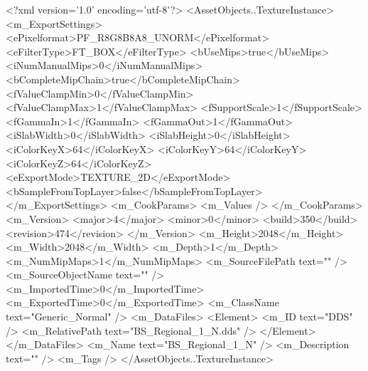 <?xml version='1.0' encoding='utf-8'?>
<AssetObjects..TextureInstance>
  <m_ExportSettings>
    <ePixelformat>PF_R8G8B8A8_UNORM</ePixelformat>
    <eFilterType>FT_BOX</eFilterType>
    <bUseMips>true</bUseMips>
    <iNumManualMips>0</iNumManualMips>
    <bCompleteMipChain>true</bCompleteMipChain>
    <fValueClampMin>0</fValueClampMin>
    <fValueClampMax>1</fValueClampMax>
    <fSupportScale>1</fSupportScale>
    <fGammaIn>1</fGammaIn>
    <fGammaOut>1</fGammaOut>
    <iSlabWidth>0</iSlabWidth>
    <iSlabHeight>0</iSlabHeight>
    <iColorKeyX>64</iColorKeyX>
    <iColorKeyY>64</iColorKeyY>
    <iColorKeyZ>64</iColorKeyZ>
    <eExportMode>TEXTURE_2D</eExportMode>
    <bSampleFromTopLayer>false</bSampleFromTopLayer>
  </m_ExportSettings>
  <m_CookParams>
    <m_Values />
  </m_CookParams>
  <m_Version>
    <major>4</major>
    <minor>0</minor>
    <build>350</build>
    <revision>474</revision>
  </m_Version>
  <m_Height>2048</m_Height>
  <m_Width>2048</m_Width>
  <m_Depth>1</m_Depth>
  <m_NumMipMaps>1</m_NumMipMaps>
  <m_SourceFilePath text="" />
  <m_SourceObjectName text="" />
  <m_ImportedTime>0</m_ImportedTime>
  <m_ExportedTime>0</m_ExportedTime>
  <m_ClassName text="Generic_Normal" />
  <m_DataFiles>
    <Element>
      <m_ID text="DDS" />
      <m_RelativePath text="BS_Regional_1_N.dds" />
    </Element>
  </m_DataFiles>
  <m_Name text="BS_Regional_1_N" />
  <m_Description text="" />
  <m_Tags />
</AssetObjects..TextureInstance>